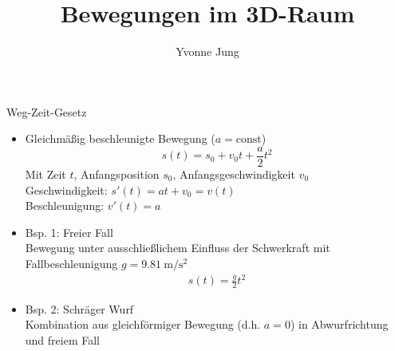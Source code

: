 \documentclass{beamer}
\title{Bewegungen im 3D-Raum}
\author[Y. Jung]{Yvonne Jung}
\institute[HS Fulda]{Hochschule Fulda, FB AI}
\begin{document}
\frame{ \titlepage }

\small

\begin{frame}{Weg-Zeit-Gesetz}
  \begin{itemize}
    \item Gleichmäßig beschleunigte Bewegung ($a = \text{const}$)
  \begin{equation}
    s (t) = s_0 + v_0 t + \frac{a}{2} t^2
  \end{equation}
    Mit Zeit $t$, Anfangsposition $s_0$, Anfangsgeschwindigkeit $v_0$\\
    Geschwindigkeit: $s' (t) = a t + v_0 = v (t)$\\
    Beschleunigung:  $v' (t) = a$
    
      \item Bsp. 1: Freier Fall \\
        Bewegung unter ausschließlichem Einfluss der Schwerkraft mit Fallbeschleunigung 
        $g = \SI{9.81}{\meter\per\square\second}$
      \begin{align}
        s (t) = \frac{g}{2} t^2
      \end{align}

      \item Bsp. 2: Schräger Wurf \\
        Kombination aus gleichförmiger Bewegung (d.h. $a = 0$) in Abwurfrichtung und freiem Fall
    
  \end{itemize}
\end{frame}
\end{document}
